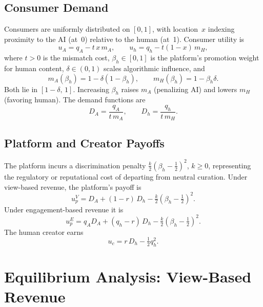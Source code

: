 \documentclass[mnsc,nonblindrev]{informs3_NoOR}
\begin{document}
\subsection{Consumer Demand}
 
Consumers are uniformly distributed on $[0,1]$, with location~$x$ indexing proximity to the AI (at~0) relative to the human (at~1). Consumer utility is
\begin{equation}\label{eq:utility}
u_A = q_A - t\,x\,m_A, \qquad u_h = q_h - t(1-x)\,m_H,
\end{equation}
where $t > 0$ is the mismatch cost, $\beta_h \in [0,1]$ is the platform's promotion weight for human content, $\delta \in (0,1)$ scales algorithmic influence, and
\begin{equation}\label{eq:mismatch}
m_A(\beta_h) = 1 - \delta(1-\beta_h), \qquad m_H(\beta_h) = 1 - \beta_h\delta.
\end{equation}
Both lie in $[1-\delta,\,1]$. Increasing $\beta_h$ raises $m_A$ (penalizing AI) and lowers $m_H$ (favoring human). The demand functions are
\begin{equation}\label{eq:demand}
D_A = \frac{q_A}{t\,m_A}, \qquad D_h = \frac{q_h }{t\,m_H}.
\end{equation}
 
\subsection{Platform and Creator Payoffs}
 
The platform incurs a discrimination penalty $\tfrac{k}{2}(\beta_h - \tfrac{1}{2})^2$, $k \geq 0$, representing the regulatory or reputational cost of departing from neutral curation. Under view-based revenue, the platform's payoff is
\begin{equation}\label{eq:up-view}
u_p^V = D_A + (1-r)\,D_h - \tfrac{k}{2}(\beta_h - \tfrac{1}{2})^2.
\end{equation}
Under engagement-based revenue it is
\begin{equation}\label{eq:up-eng}
u_p^E = q_A D_A + (q_h - r)\,D_h - \tfrac{k}{2}(\beta_h - \tfrac{1}{2})^2.
\end{equation}
The human creator earns
\begin{equation}\label{eq:uc}
u_c = r\,D_h - \tfrac{1}{2}q_h^2.
\end{equation}

\section{Equilibrium Analysis: View-Based Revenue}\label{sec:view}
\end{document}
